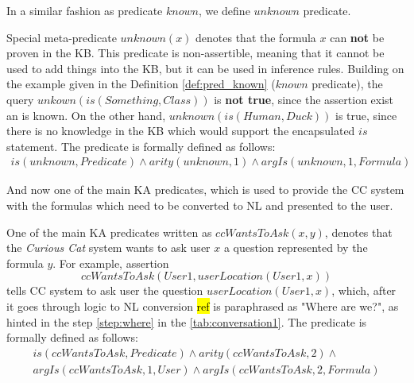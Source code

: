 In a similar fashion as predicate $known$, we define $unknown$ predicate.

\begin{definition}\label{def:pred_unknown}
Special meta-predicate $unknown(x)$ denotes that the formula $x$ can 
\textbf{not} be proven in the KB. This predicate is non-assertible, meaning that it cannot be used to add things into the KB, but it can be used in inference 
rules. Building on the example given in the Definition \ref{def:pred_known}
($known$ predicate), the query $unkown(is(Something,Class))$ is 
\textbf{not true}, since the assertion exist an is known. On the other hand,
$unknown(is(Human,Duck))$ is true, since there is no knowledge in the KB which
would support the encapsulated $is$ statement. The predicate is formally defined as follows:
\begin{equation}\label{as:unknown}
\begin{gathered}
	is(unknown,Predicate) \land arity(unknown,1) \land argIs(unknown,1,Formula)
\end{gathered}
\end{equation}
\end{definition}

And now one of the main KA predicates, which is used to provide the CC system
with the formulas which need to be converted to NL and presented to the user.
\begin{definition}\label{def:pred_ccWantsToAsk}
One of the main KA predicates written as $ccWantsToAsk(x,y)$, denotes that the 
\emph{Curious Cat} system wants to ask user $x$ a question represented by the
formula $y$. For example, assertion 
\begin{equation*}
ccWantsToAsk(User1, userLocation(User1,x))
\end{equation*}
tells CC system to ask user the question $userLocation(User1,x)$, which,
after it goes through logic to NL conversion \hl{ref} is paraphrased as
"Where are we?", as hinted in the step \ref{step:where} in the 
\autoref{tab:conversation1}. The predicate is formally defined as follows:
\begin{equation}\label{as:ccWantsToAsk}
\begin{gathered}
	is(ccWantsToAsk,Predicate) \land arity(ccWantsToAsk,2) \land\\ 
	argIs(ccWantsToAsk,1,User) \land argIs(ccWantsToAsk,2,Formula)
\end{gathered}
\end{equation}
\end{definition}

